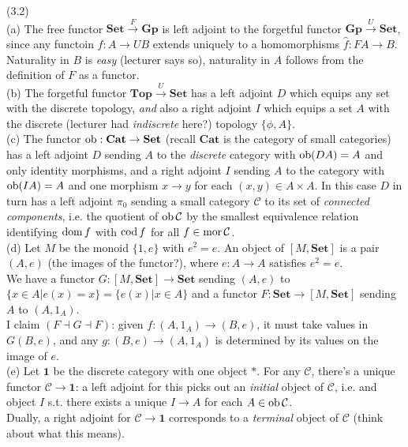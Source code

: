 \documentclass[a4paper]{article}
\begin{document}
\begin{eg} (3.2)\\
    (a) The free functor $\mathbf{Set} \xrightarrow{F} \mathbf{Gp}$ is left adjoint to the forgetful functor $\mathbf{Gp} \xrightarrow{U} \mathbf{Set}$, since any functoin $f:A \to UB$ extends uniquely to a homomorphisms $\hat{f}: FA \to B$.\\
    Naturality in $B$ is \emph{easy} (lecturer says so), naturality in $A$ follows from the definition of $F$ as a functor.\\
    (b) The forgetful functor $\mathbf{Top} \xrightarrow{U} \mathbf{Set}$ has a left adjoint $D$ which equips any set with the discrete topology, \emph{and} also a right adjoint $I$ which equips a set $A$ with the discrete (lecturer had \emph{indiscrete} here?) topology $\{\phi,A\}$.\\
    (c) The functor $\operatorname{ob}: \mathbf{Cat} \to \mathbf{Set}$ (recall $\mathbf{Cat}$ is the category of small categories) has a left adjoint $D$ sending $A$ to the \emph{discrete} category with $\operatorname{ob}(DA) = A$ and only identity morphisms, and a right adjoint $I$ sending $A$ to the category with $\operatorname{ob}(IA) = A$ and one morphism $x \to y$ for each $(x,y) \in A \times A$. In this case $D$ in turn has a left adjoint $\pi_0$ sending a small category $\mathcal{C}$ to its set of \emph{connected components}, i.e. the quotient of $\operatorname{ob}\mathcal{C}$ by the smallest equivalence relation identifying $\operatorname{dom} f$ with $\operatorname{cod} f$ for all $f \in \operatorname{mor} \mathcal{C}$.\\
    (d) Let $M$ be the monoid $\{1,e\}$ with $e^2=e$. An object of $[M,\mathbf{Set}]$ is a pair $(A,e)$ (the images of the functor?), where $e:A \to A$ satisfies $e^2=e$.\\
    We have a functor $G:[M,\mathbf{Set}] \to \mathbf{Set}$ sending $(A,e)$ to $\{x \in A | e(x) = x \} = \{e(x) | x \in A\}$ and a functor $F: \mathbf{Set} \to [M,\mathbf{Set}]$ sending $A$ to $(A,1_A)$.\\
    I claim $(F \dashv G \dashv F)$: given $f:(A,1_A) \to (B,e)$, it must take values in $G(B,e)$, and any $g:(B,e) \to (A,1_A)$ is determined by its values on the image of $e$.\\
    (e) Let $\mathbf{1}$ be the discrete category with one object $*$. For any $\mathcal{C}$, there's a unique functor $\mathcal{C} \to \mathbf{1}$: a left adjoint for this picks out an \emph{initial} object of $\mathcal{C}$, i.e. and object $I$ s.t. there exists a unique $I \to A$ for each $A \in \operatorname{ob} \mathcal{C}$.\\
    Dually, a right adjoint for $\mathcal{C} \to \mathbf{1}$ corresponds to a \emph{terminal} object of $\mathcal{C}$ (think about what this means).\\

\end{eg}
\end{document}
